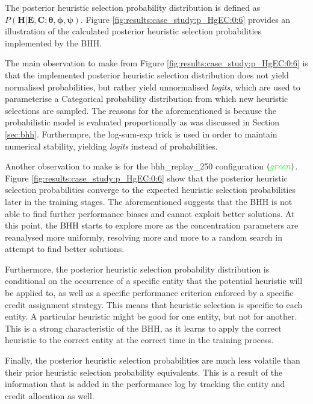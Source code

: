 The posterior heuristic selection probability distribution is defined as $P(\boldsymbol{H} \vert \boldsymbol{E}, \boldsymbol{C}; \boldsymbol{\theta}, \boldsymbol{\phi}, \boldsymbol{\psi})$. Figure \ref{fig:results:case_study:p_HgEC:0:6} provides an illustration of the calculated posterior heuristic selection probabilities implemented by the \acs{BHH}.

The main observation to make from Figure \ref{fig:results:case_study:p_HgEC:0:6} is that the implemented posterior heuristic selection distribution does not yield normalised probabilities, but rather yield unnormalised \textit{logits}, which are used to parameterise a Categorical probability distribution from which new heuristic selections are sampled. The reasons for the aforementioned is because the probabilistic model is evaluated proportionally as was discussed in Section \ref{sec:bhh}. Furthermpre, the log-sum-exp trick is used in order to maintain numerical stability, yielding \textit{logits} instead of probabilities.

Another observation to make is for the bhh\_replay\_250 configuration $(\textcolor{green}{green})$. Figure \ref{fig:results:case_study:p_HgEC:0:6} show that the posterior heuristic selection probabilities converge to the expected heuristic selection probabilities later in the training stages. The aforementioned suggests that the \acs{BHH} is not able to find further performance biases and cannot exploit better solutions. At this point, the \acs{BHH} starts to explore more as the concentration parameters are reanalysed more uniformly, resolving more and more to a random search in attempt to find better solutions.

Furthermore, the posterior heuristic selection probability distribution is conditional on the occurrence of a specific entity that the potential heuristic will be applied to, as well as a specific performance criterion enforced by a specific credit assignment strategy. This means that heuristic selection is specific to each entity. A particular heuristic might be good for one entity, but not for another. This is a strong characteristic of the \acs{BHH}, as it learns to apply the correct heuristic to the correct entity at the correct time in the training process.

Finally, the posterior heuristic selection probabilities are much less volatile than their prior heuristic selection probability equivalents. This is a result of the information that is added in the performance log by tracking the entity and credit allocation as well.


